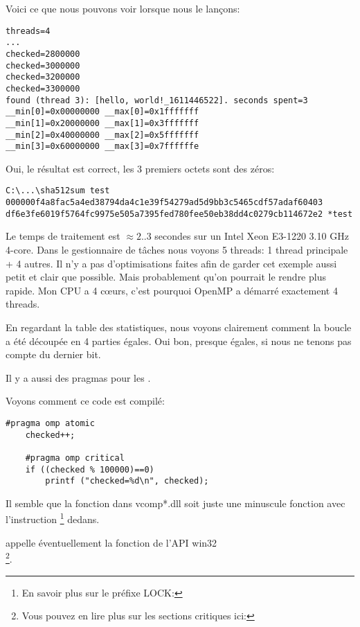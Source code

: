 Voici ce que nous pouvons voir lorsque nous le lançons:

\begin{lstlisting}
threads=4
...
checked=2800000
checked=3000000
checked=3200000
checked=3300000
found (thread 3): [hello, world!_1611446522]. seconds spent=3
__min[0]=0x00000000 __max[0]=0x1fffffff
__min[1]=0x20000000 __max[1]=0x3fffffff
__min[2]=0x40000000 __max[2]=0x5fffffff
__min[3]=0x60000000 __max[3]=0x7ffffffe
\end{lstlisting}

Oui, le résultat est correct, les 3 premiers octets sont des zéros:

\begin{lstlisting}
C:\...\sha512sum test
000000f4a8fac5a4ed38794da4c1e39f54279ad5d9bb3c5465cdf57adaf60403
df6e3fe6019f5764fc9975e505a7395fed780fee50eb38dd4c0279cb114672e2 *test
\end{lstlisting}

Le temps de traitement est $\approx2..3$ secondes sur un Intel Xeon E3-1220 3.10 GHz 4-core.
Dans le gestionnaire de tâches nous voyons 5 threads:
1 thread principale + 4 autres.
Il n'y a pas d'optimisations faites afin de garder cet exemple aussi petit et clair
que possible.
Mais probablement qu'on pourrait le rendre plus rapide.
Mon \ac{CPU} a 4 c\oe{}urs, c'est pourquoi OpenMP a démarré exactement 4 threads.

En regardant la table des statistiques, nous voyons clairement comment la boucle
a été découpée en 4 parties égales.
Oui bon, presque égales, si nous ne tenons pas compte du dernier bit.

Il y a aussi des pragmas pour les .

Voyons comment ce code est compilé:

\begin{lstlisting}[style=customc]
	#pragma omp atomic
	checked++;

	#pragma omp critical
	if ((checked % 100000)==0)
		printf ("checked=%d\n", checked);
\end{lstlisting}



Il semble que la fonction  dans vcomp*.dll soit juste
une minuscule fonction avec l'instruction \footnote{En savoir plus sur le préfixe LOCK: }
dedans.

appelle éventuellement la fonction de l'\ac{API} win32 \\
\footnote{Vous pouvez en lire plus sur les sections critiques ici: }.

